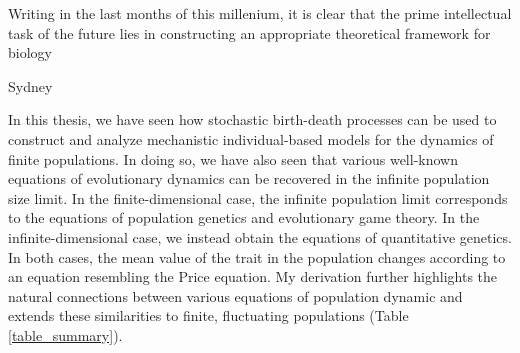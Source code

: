 \epigraph{\justifying Writing in the last months of this millenium, it is clear that the prime intellectual task of the future lies in constructing an appropriate theoretical framework for biology}{Sydney~\citet{brenner_theoretical_1999}}

\justifying
In this thesis, we have seen how stochastic birth-death processes can be used to construct and analyze mechanistic individual-based models for the dynamics of finite populations. In doing so, we have also seen that various well-known equations of evolutionary dynamics can be recovered in the infinite population size limit. In the finite-dimensional case, the infinite population limit corresponds to the equations of population genetics and evolutionary game theory. In the infinite-dimensional case, we instead obtain the equations of quantitative genetics. In both cases, the mean value of the trait in the population changes according to an equation resembling the Price equation. My derivation further highlights the natural connections between various equations of population dynamic and extends these similarities to finite, fluctuating populations (Table \ref{table_summary}).

